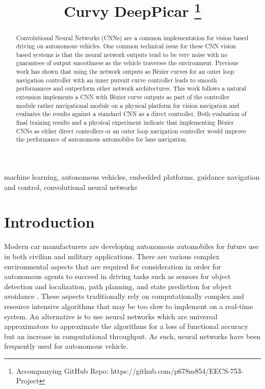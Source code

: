 \documentclass[conference]{IEEEtran}
\begin{document}
\title{Curvy DeepPicar
\thanks{Accompanying GitHub Repo: https://github.com/p678m854/EECS-753-Project}
}

\author{
}

\maketitle

\begin{abstract}

Convolutional Neural Networks (CNNs) are a common implementation for vision based driving on autonomous vehicles. One common technical issue for these CNN vision based systems is that the neural network outputs tend to be very noise with no guarantees of output smoothness as the vehicle traverses the environment. Previous work has shown that using the network outputs as B\`ezier curves for an outer loop navigation controller with an inner pursuit curve controller leads to smooth performances and outperform other network architectures. This work follows a natural extension implements a CNN with B\`ezier curve outputs as part of the controller module rather navigational module on a physical platform for vision navigation and evaluates the results against a standard CNN as a direct controller. Both evaluation of final training results and a physical experiment indicate that implementing B\`ezier CNNs as either direct controllers or an outer loop navigation controller would improve the performance of autonomous automobiles for lane navigation.

\end{abstract}

\begin{IEEEkeywords}
machine learning, autonomous vehicles, embedded platforms, guidance navigation and control, convolutional neural networks
\end{IEEEkeywords}

\section{Introduction}

Modern car manufacturers are developing autonomous automobiles for future use in both civilian and military applications. There are various complex environmental aspects that are required for consideration in order for autonomous agents to succeed in driving tasks such as sensors for object detection and localization, path planning, and state prediction for object avoidance \cite{kato2018}. These aspects traditionally rely on computationally complex and resource intensive algorithms that may be too slow to implement on a real-time system. An alternative is to use neural networks which are universal approximators \cite{wang2021interval} to approximate the algorithms for a loss of functional accuracy but an increase in computational throughput. As such, neural networks have been frequently used for autonomous vehicle.
\end{document}
